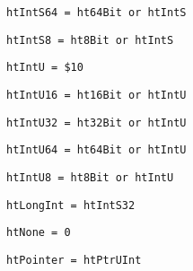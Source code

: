 \begin{verbatim}
htIntS64 = ht64Bit or htIntS
\end{verbatim}
\label{thoriumcore:thorium:htints64}



\begin{verbatim}
htIntS8 = ht8Bit or htIntS
\end{verbatim}
\label{thoriumcore:thorium:htints8}



\begin{verbatim}
htIntU = $10
\end{verbatim}
\label{thoriumcore:thorium:htintu}



\begin{verbatim}
htIntU16 = ht16Bit or htIntU
\end{verbatim}
\label{thoriumcore:thorium:htintu16}



\begin{verbatim}
htIntU32 = ht32Bit or htIntU
\end{verbatim}
\label{thoriumcore:thorium:htintu32}



\begin{verbatim}
htIntU64 = ht64Bit or htIntU
\end{verbatim}
\label{thoriumcore:thorium:htintu64}



\begin{verbatim}
htIntU8 = ht8Bit or htIntU
\end{verbatim}
\label{thoriumcore:thorium:htintu8}



\begin{verbatim}
htLongInt = htIntS32
\end{verbatim}
\label{thoriumcore:thorium:htlongint}



\begin{verbatim}
htNone = 0
\end{verbatim}
\label{thoriumcore:thorium:htnone}



\begin{verbatim}
htPointer = htPtrUInt
\end{verbatim}
\label{thoriumcore:thorium:htpointer}



